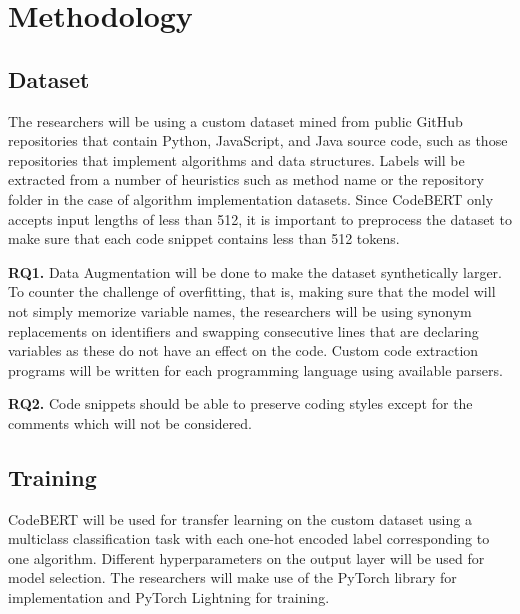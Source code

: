 \chapter{Methodology}



\section{Dataset}

The researchers will be using a custom dataset mined from public GitHub 
repositories that contain Python, JavaScript, and Java source code, such as 
those repositories that implement  algorithms and data structures. Labels 
will be extracted from a number of heuristics such as method name or the 
repository folder in the case of algorithm implementation datasets. Since 
CodeBERT only accepts input lengths of less than 512, it is important to 
preprocess the dataset to make sure that each code snippet contains less than 
512 tokens\cite{devlin2018bert}\cite{liu2019roberta}.

\textbf{RQ1.} Data Augmentation\cite{feng2021survey}
will be done to make the dataset synthetically larger. To counter the challenge of 
overfitting, that is, making sure that the model will not simply memorize variable 
names, the researchers will be using synonym replacements on identifiers and swapping 
consecutive lines that are declaring variables as these do not have an effect on the code. 
Custom code extraction programs will be written for each programming language using available parsers.

\textbf{RQ2.} Code snippets should be able to preserve coding styles except for the 
comments which will not be considered.

\section{Training}

CodeBERT will be used for transfer learning on the custom dataset using a multiclass 
classification task with each one-hot encoded label corresponding to one algorithm. 
Different hyperparameters on the output layer will be used for model selection. The 
researchers will make use of the PyTorch\cite{paszke2019pytorch} library for implementation 
and PyTorch Lightning for training\cite{Falcon_PyTorch_Lightning_2019}.

